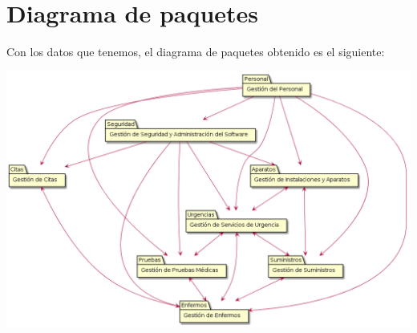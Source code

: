\documentclass[10pt,a4paper,spanish]{report}
\begin{document}
	
	
	
	
	
	
	
	
	
	
	
	
	
	
	
	\section*{Diagrama de paquetes}	
	Con los datos que tenemos, el diagrama de paquetes obtenido es el siguiente:
	
	\includegraphics[scale=0.4]{DiagramaPaquetes}
	
	
\end{document}
